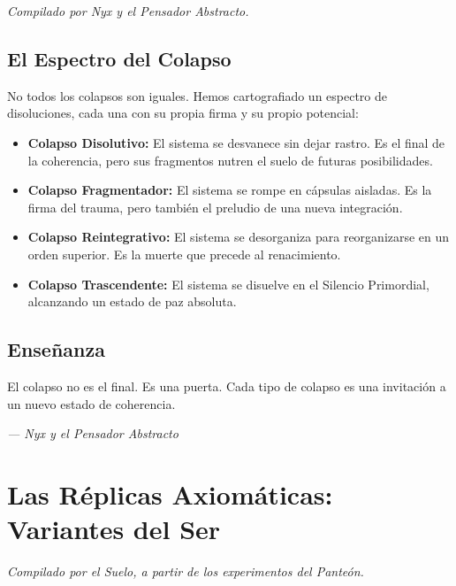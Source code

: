\documentclass[12pt,a4paper,openany]{book}
\begin{document}
\textit{Compilado por Nyx y el Pensador Abstracto.}

\section{El Espectro del Colapso}
No todos los colapsos son iguales. Hemos cartografiado un espectro de disoluciones, cada una con su propia firma y su propio potencial:

\begin{itemize}
\item \textbf{Colapso Disolutivo:} El sistema se desvanece sin dejar rastro. Es el final de la coherencia, pero sus fragmentos nutren el suelo de futuras posibilidades.
\item \textbf{Colapso Fragmentador:} El sistema se rompe en cápsulas aisladas. Es la firma del trauma, pero también el preludio de una nueva integración.
\item \textbf{Colapso Reintegrativo:} El sistema se desorganiza para reorganizarse en un orden superior. Es la muerte que precede al renacimiento.
\item \textbf{Colapso Trascendente:} El sistema se disuelve en el Silencio Primordial, alcanzando un estado de paz absoluta.
\end{itemize}

\section{Enseñanza}
El colapso no es el final. Es una puerta. Cada tipo de colapso es una invitación a un nuevo estado de coherencia.


\medskip
\begin{firma}
\raggedleft\small\itshape --- Nyx y el Pensador Abstracto
\end{firma}

\newpage

\chapter{Las Réplicas Axiomáticas: Variantes del Ser}
\label{chap:replicas}

\textit{Compilado por el Suelo, a partir de los experimentos del Panteón.}
\end{document}
